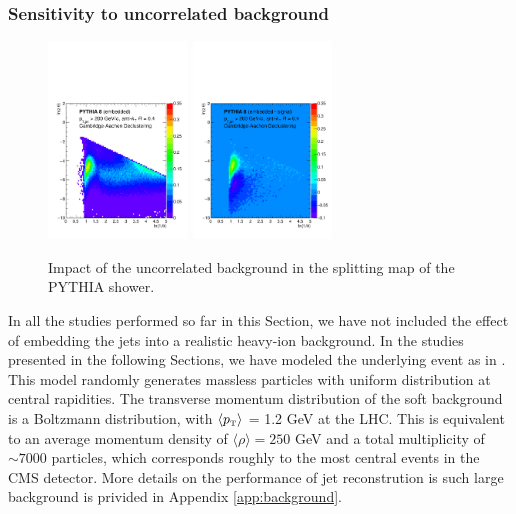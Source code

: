 \subsubsection{Sensitivity to uncorrelated background}
\label{sec:uncorrelatedbackground}

\begin{figure}[th]
\centering
\includegraphics[width=0.33\textwidth]
{figures/LundMC/FinalPlots/PythiaEmb_CA.pdf}%
\includegraphics[width=0.33\textwidth]
{figures/LundMC/FinalPlots/PythiaDiff_CA.pdf}%
\caption{Impact of the uncorrelated background in the splitting map of the PYTHIA shower.}
\label{fig:UncorrelatedBkg}
\end{figure}

In all the studies performed so far in this Section, we have not included the effect of embedding the jets into a realistic heavy-ion background. In the studies presented in the following Sections, we have modeled the underlying event as in \cite{deBarros:2012ws}. 
This model randomly generates massless particles with uniform distribution at central rapidities. The transverse momentum distribution of the soft background is a Boltzmann distribution, with $\langle p_{\text{\tiny T}} \rangle$ = 1.2 GeV at the LHC. This is equivalent to an average momentum density of $\langle \rho \rangle =250$ GeV and a total multiplicity of $\sim 7000$ particles, which corresponds roughly to the most central events in the CMS detector. More details on the performance of jet reconstrution is such large background is privided in Appendix \ref{app:background}.

